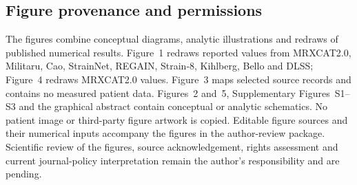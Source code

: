 \documentclass[11pt,a4paper]{article}
\begin{document}
\subsection*{Figure provenance and permissions}
The figures combine conceptual diagrams, analytic illustrations and redraws of published numerical results. Figure~1 redraws reported values from MRXCAT2.0, Militaru, Cao, StrainNet, REGAIN, Strain-8, Kihlberg, Bello and DLSS; Figure~4 redraws MRXCAT2.0 values. Figure~3 maps selected source records and contains no measured patient data. Figures~2 and~5, Supplementary Figures~S1--S3 and the graphical abstract contain conceptual or analytic schematics. No patient image or third-party figure artwork is copied. Editable figure sources and their numerical inputs accompany the figures in the author-review package. Scientific review of the figures, source acknowledgement, rights assessment and current journal-policy interpretation remain the author's responsibility and are pending.

\setlength{\bibsep}{2pt}


\end{document}
